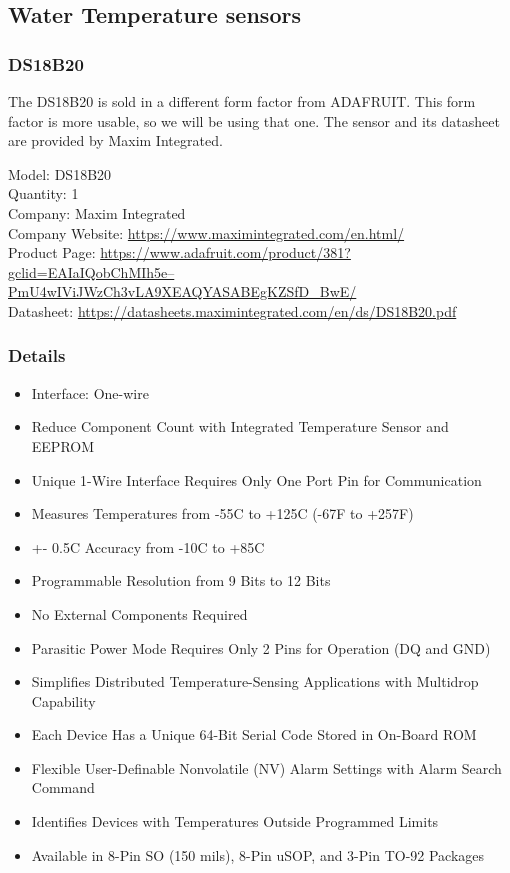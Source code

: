 \subsection{Water Temperature sensors}

\subsubsection{DS18B20}

The DS18B20 is sold in a different form factor from ADAFRUIT. This form factor is more usable, so we will be using that one. The sensor and its datasheet are provided by Maxim Integrated.

Model: DS18B20\\
Quantity: 1\\
Company: Maxim Integrated \\
Company Website: \href{https://www.maximintegrated.com/en.html/}{https://www.maximintegrated.com/en.html/} \\
Product Page: \href{https://www.adafruit.com/product/381?gclid=EAIaIQobChMIh5e--PmU4wIViJWzCh3vLA9XEAQYASABEgKZSfD_BwE/}{https://www.adafruit.com/product/381?gclid=EAIaIQobChMIh5e--PmU4wIViJWzCh3vLA9XEAQYASABEgKZSfD\_BwE/} \\
Datasheet: \href{https://datasheets.maximintegrated.com/en/ds/DS18B20.pdf}{https://datasheets.maximintegrated.com/en/ds/DS18B20.pdf} \\

\subsubsection{Details}
\begin{itemize}
	\item Interface: One-wire
	\item Reduce Component Count with Integrated Temperature Sensor and EEPROM
	\item Unique 1-Wire Interface Requires Only One Port Pin for Communication
	\item Measures Temperatures from -55\degree C to +125\degree C (-67\degree F to +257\degree F)
	\item +- 0.5\degree C Accuracy from -10\degree C to +85\degree C
	\item Programmable Resolution from 9 Bits to 12 Bits
	\item No External Components Required
	\item Parasitic Power Mode Requires Only 2 Pins for Operation (DQ and GND)
	\item Simplifies Distributed Temperature-Sensing Applications with Multidrop Capability
	\item Each Device Has a Unique 64-Bit Serial Code Stored in On-Board ROM
	\item Flexible User-Definable Nonvolatile (NV) Alarm Settings with Alarm Search Command
	\item Identifies Devices with Temperatures Outside Programmed Limits
	\item Available in 8-Pin SO (150 mils), 8-Pin  uSOP, and 3-Pin TO-92 Packages 
\end{itemize}


